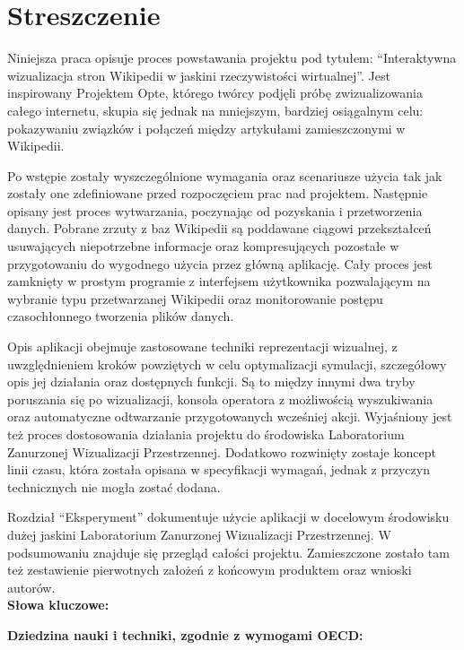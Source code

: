 \chapter*{Streszczenie}
Niniejsza praca opisuje proces powstawania projektu pod tytułem: ``Interaktywna wizualizacja stron Wikipedii w jaskini rzeczywistości wirtualnej''. Jest inspirowany Projektem Opte, którego twórcy podjęli próbę zwizualizowania całego internetu, skupia się jednak na mniejszym, bardziej osiągalnym celu: pokazywaniu związków i połączeń między artykułami zamieszczonymi w Wikipedii. 

Po wstępie zostały wyszczególnione wymagania oraz scenariusze użycia tak jak zostały one zdefiniowane przed rozpoczęciem prac nad projektem. Następnie opisany jest proces wytwarzania, poczynając od pozyskania i przetworzenia danych. Pobrane zrzuty z baz Wikipedii są poddawane ciągowi przekształceń usuwających niepotrzebne informacje oraz kompresujących pozostałe w przygotowaniu do wygodnego użycia przez główną aplikację. Cały proces jest zamknięty w prostym programie z interfejsem użytkownika pozwalającym na wybranie typu przetwarzanej Wikipedii oraz monitorowanie postępu czasochłonnego tworzenia plików danych.

Opis aplikacji obejmuje zastosowane techniki reprezentacji wizualnej, z uwzględnieniem kroków powziętych w celu optymalizacji symulacji, szczegółowy opis jej działania oraz dostępnych funkcji. Są to między innymi dwa tryby poruszania się po wizualizacji, konsola operatora z możliwością wyszukiwania oraz automatyczne odtwarzanie przygotowanych wcześniej akcji. Wyjaśniony jest też proces dostosowania działania projektu do środowiska Laboratorium Zanurzonej Wizualizacji Przestrzennej. Dodatkowo rozwinięty zostaje koncept linii czasu, która została opisana w specyfikacji wymagań, jednak z przyczyn technicznych nie mogła zostać dodana.

Rozdział ``Eksperyment'' dokumentuje użycie aplikacji w docelowym środowisku dużej jaskini Laboratorium Zanurzonej Wizualizacji Przestrzennej. W podsumowaniu znajduje się przegląd całości projektu. Zamieszczone zostało tam też zestawienie pierwotnych założeń z końcowym produktem oraz wnioski autorów.\\

\noindent\textbf{Słowa kluczowe:} 

\noindent\textbf{Dziedzina nauki i techniki, zgodnie z wymogami OECD:} 
